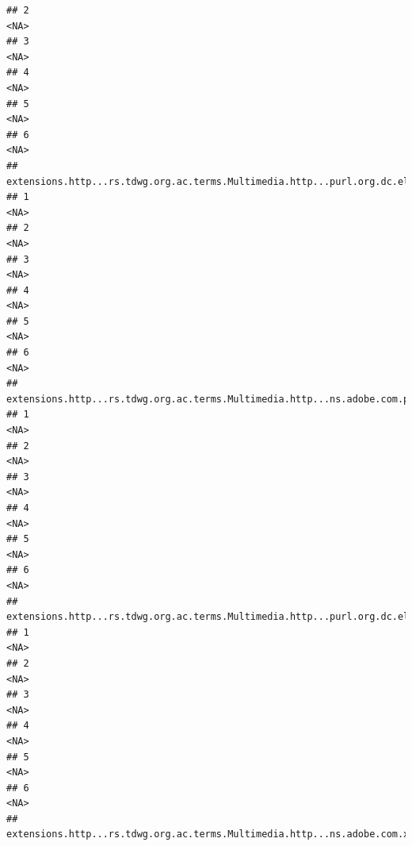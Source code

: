 \documentclass[
]{book}
\begin{document}
\begin{verbatim}
## 2                                                                                         <NA>
## 3                                                                                         <NA>
## 4                                                                                         <NA>
## 5                                                                                         <NA>
## 6                                                                                         <NA>
##   extensions.http...rs.tdwg.org.ac.terms.Multimedia.http...purl.org.dc.elements.1.1.format.1
## 1                                                                                       <NA>
## 2                                                                                       <NA>
## 3                                                                                       <NA>
## 4                                                                                       <NA>
## 5                                                                                       <NA>
## 6                                                                                       <NA>
##   extensions.http...rs.tdwg.org.ac.terms.Multimedia.http...ns.adobe.com.photoshop.1.0.Credit.1
## 1                                                                                         <NA>
## 2                                                                                         <NA>
## 3                                                                                         <NA>
## 4                                                                                         <NA>
## 5                                                                                         <NA>
## 6                                                                                         <NA>
##   extensions.http...rs.tdwg.org.ac.terms.Multimedia.http...purl.org.dc.elements.1.1.creator.1
## 1                                                                                        <NA>
## 2                                                                                        <NA>
## 3                                                                                        <NA>
## 4                                                                                        <NA>
## 5                                                                                        <NA>
## 6                                                                                        <NA>
##   extensions.http...rs.tdwg.org.ac.terms.Multimedia.http...ns.adobe.com.xap.1.0.CreateDate.1

\end{verbatim}
\end{document}
